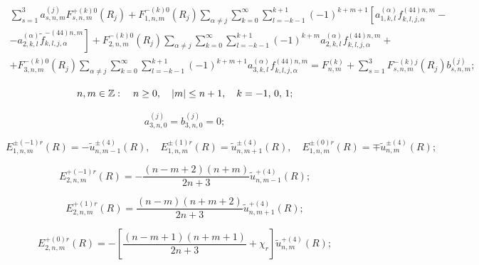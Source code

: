 \begin{multline}
\sum\limits_{s = 1}^3 {a_{s,n,m}^{(j)}} F_{s,n,m}^{ + (k)0}({R_j}) + F_{1,n,m}^{ - (k)0}({R_j})\sum\limits_{\alpha  \ne j} {\sum\limits_{k = 0}^\infty  {\sum\limits_{l =  - k - 1}^{k + 1} {{{( - 1)}^{k + m + 1}}} } \left[ {a_{1,k,l}^{(\alpha )}f_{k,l,j,\alpha }^{(44)n,m} - } \right.} \\
\left. { - a_{2,k,l}^{(\alpha )}\tilde f_{k,l,j,\alpha }^{ - (44)n,m}} \right] + F_{2,n,m}^{ - (k)0}({R_j})\sum\limits_{\alpha  \ne j} {\sum\limits_{k = 0}^\infty  {\sum\limits_{l =  - k - 1}^{k + 1} {{{( - 1)}^{k + m}}} } a_{2,k,l}^{(\alpha )}f_{k,l,j,\alpha }^{(44)n,m} + } \\
+ F_{3,n,m}^{ - (k)0}({R_j})\sum\limits_{\alpha  \ne j} \sum\limits_{k = 0}^\infty  {\sum\limits_{l =  - k - 1}^{k + 1} {{{( - 1)}^{k + m + 1}}} } a_{3,k,l}^{(\alpha )}f_{k,l,j,\alpha }^{(44)n,m} = F_{n,m}^{(k)} + \sum\limits_{s = 1}^3 {F_{s,n,m}^{ - (k)j}} ({R_j})b_{s,n,m}^{(j)};
\end{multline}

\begin{equation}
n,m \in\mathbb{Z} :\quad n \ge 0,\quad |m| \le n + 1,\quad k =  - 1,{\mkern 1mu} {\kern 1pt} 0,{\mkern 1mu} {\kern 1pt} 1;
\end{equation}

\begin{equation}
a_{3,n,0}^{(j)} = b_{3,n,0}^{(j)} = 0;
\end{equation}

\begin{equation}
E_{1,n,m}^{ \pm ( - 1)r}(R) =  - \tilde u_{n,m - 1}^{ \pm (4)}(R),\quad E_{1,n,m}^{ \pm (1)r}(R) = \tilde u_{n,m + 1}^{ \pm (4)}(R), \quad 
E_{1,n,m}^{ \pm (0)r}(R) =  \mp \tilde u_{n,m}^{ \pm (4)}(R);
\end{equation}

\begin{equation}
E_{2,n,m}^{ + ( - 1)r}(R) =  - \frac{{(n - m + 2)(n + m)}}{{2n + 3}}\tilde u_{n,m - 1}^{ + (4)}(R);
\end{equation}

\begin{equation}
E_{2,n,m}^{ + (1)r}(R) = \frac{{(n - m)(n + m + 2)}}{{2n + 3}}\tilde u_{n,m + 1}^{ + (4)}(R);
\end{equation}

\begin{equation}
E_{2,n,m}^{ + (0)r}(R) =  - \left[ {\frac{{(n - m + 1)(n + m + 1)}}{{2n + 3}} + {\chi _r}} \right]\tilde u_{n,m}^{ + (4)}(R);
\end{equation}

